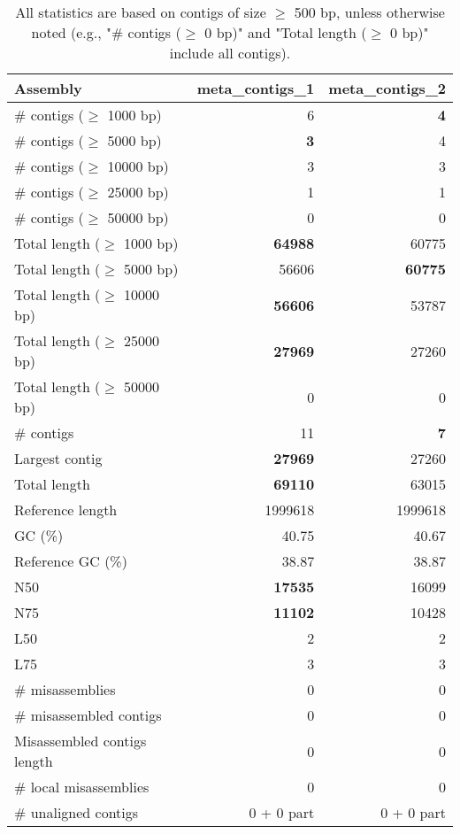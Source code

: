 \documentclass[12pt,a4paper]{article}
\begin{document}
\begin{table}[ht]
\begin{center}
\caption{All statistics are based on contigs of size $\geq$ 500 bp, unless otherwise noted (e.g., "\# contigs ($\geq$ 0 bp)" and "Total length ($\geq$ 0 bp)" include all contigs).}
\begin{tabular}{|l*{2}{|r}|}
\hline
Assembly & meta\_contigs\_1 & meta\_contigs\_2 \\ \hline
\# contigs ($\geq$ 1000 bp) & 6 & {\bf 4} \\ \hline
\# contigs ($\geq$ 5000 bp) & {\bf 3} & 4 \\ \hline
\# contigs ($\geq$ 10000 bp) & 3 & 3 \\ \hline
\# contigs ($\geq$ 25000 bp) & 1 & 1 \\ \hline
\# contigs ($\geq$ 50000 bp) & 0 & 0 \\ \hline
Total length ($\geq$ 1000 bp) & {\bf 64988} & 60775 \\ \hline
Total length ($\geq$ 5000 bp) & 56606 & {\bf 60775} \\ \hline
Total length ($\geq$ 10000 bp) & {\bf 56606} & 53787 \\ \hline
Total length ($\geq$ 25000 bp) & {\bf 27969} & 27260 \\ \hline
Total length ($\geq$ 50000 bp) & 0 & 0 \\ \hline
\# contigs & 11 & {\bf 7} \\ \hline
Largest contig & {\bf 27969} & 27260 \\ \hline
Total length & {\bf 69110} & 63015 \\ \hline
Reference length & 1999618 & 1999618 \\ \hline
GC (\%) & 40.75 & 40.67 \\ \hline
Reference GC (\%) & 38.87 & 38.87 \\ \hline
N50 & {\bf 17535} & 16099 \\ \hline
N75 & {\bf 11102} & 10428 \\ \hline
L50 & 2 & 2 \\ \hline
L75 & 3 & 3 \\ \hline
\# misassemblies & 0 & 0 \\ \hline
\# misassembled contigs & 0 & 0 \\ \hline
Misassembled contigs length & 0 & 0 \\ \hline
\# local misassemblies & 0 & 0 \\ \hline
\# unaligned contigs & 0 + 0 part & 0 + 0 part \\ \hline

\end{tabular}
\end{center}
\end{table}
\end{document}
